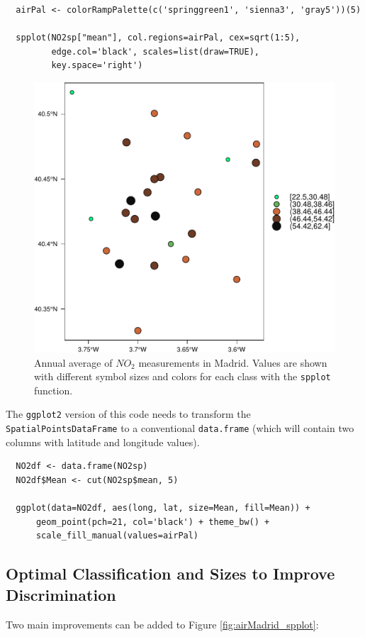 \lstset{language=r,label= ,caption= ,captionpos=b,numbers=none}
\begin{lstlisting}
  airPal <- colorRampPalette(c('springgreen1', 'sienna3', 'gray5'))(5)
  
  spplot(NO2sp["mean"], col.regions=airPal, cex=sqrt(1:5),
         edge.col='black', scales=list(draw=TRUE),
         key.space='right')
\end{lstlisting}

\begin{figure}[htbp]
\centering
\includegraphics[width=.9\linewidth]{figs/airMadrid_spplot.pdf}
\caption{\label{fig:orgfd87f1f}
Annual average of \(NO_2\) measurements in Madrid. Values are shown with different symbol sizes and  colors for each class with the \texttt{spplot} function.}
\end{figure}

The \texttt{ggplot2} version of this code needs to transform the
\texttt{SpatialPointsDataFrame} to a conventional \texttt{data.frame} (which
will contain two columns with latitude and longitude values).
\lstset{language=r,label= ,caption= ,captionpos=b,numbers=none}
\begin{lstlisting}
  NO2df <- data.frame(NO2sp)
  NO2df$Mean <- cut(NO2sp$mean, 5)
  
  ggplot(data=NO2df, aes(long, lat, size=Mean, fill=Mean)) +
      geom_point(pch=21, col='black') + theme_bw() +
      scale_fill_manual(values=airPal)
\end{lstlisting}

\subsection{Optimal Classification and Sizes to Improve Discrimination}
\label{sec:org0e2a31c}
Two main improvements can be added to Figure
\ref{fig:airMadrid_spplot}:

